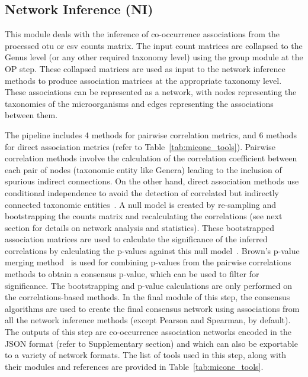 \documentclass[letterpaper,12pt]{article}
\begin{document}
  \subsection*{Network Inference (NI)}
  \vspace{-5mm}
  This module deals with the inference of co-occurrence associations from the processed \ac{otu} or \ac{esv} counts matrix.
  The input count matrices are collapsed to the Genus level (or any other required taxonomy level) using the group module at the OP step.
  These collapsed matrices are used as input to the network inference methods to produce association matrices at the appropriate taxonomy level.
  These associations can be represented as a network, with nodes representing the taxonomies of the microorganisms and edges representing the associations between them.

  The pipeline includes 4 methods for pairwise correlation metrics, and 6 methods for direct association metrics (refer to Table~\ref{tab:micone_tools}).
  Pairwise correlation methods involve the calculation of the correlation coefficient between each pair of nodes (taxonomic entity like Genera) leading to the inclusion of spurious indirect connections.
  On the other hand, direct association methods use conditional independence to avoid the detection of correlated but indirectly connected taxonomic entities~\cite{Kurtz2015,Menon2018}.
  A null model is created by re-sampling and bootstrapping the counts matrix and recalculating the correlations (see next section for details on network analysis and statistics).
  These bootstrapped association matrices are used to calculate the significance of the inferred correlations by calculating the p-values against this null model~\cite{Watts2018}.
  Brown's p-value merging method~\cite{brown_400_1975} is used for combining p-values from the pairwise correlations methods to obtain a consensus p-value, which can be used to filter for significance.
  The bootstrapping and p-value calculations are only performed on the correlations-based methods.
  In the final module of this step, the consensus algorithms are used to create the final consensus network using associations from all the network inference methods (except Pearson and Spearman, by default).
  The outputs of this step are co-occurrence association networks encoded in the JSON format (refer to Supplementary section) and which can also be exportable to a variety of network formats.
  The list of tools used in this step, along with their modules and references are provided in Table~\ref{tab:micone_tools}.
\end{document}

